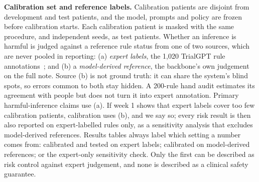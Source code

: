 \documentclass[10pt,a4paper]{article}
\begin{document}
\textbf{Calibration set and reference labels.} Calibration patients are disjoint from development and test patients, and the model, prompts and policy are frozen before calibration starts. Each calibration patient is masked with the same procedure, and independent seeds, as test patients. Whether an inference is harmful is judged against a reference rule status from one of two sources, which are never pooled in reporting: (a) \emph{expert labels}, the 1{,}020 TrialGPT rule annotations~\cite{trialgptann}; and (b) a \emph{model-derived reference}, the backbone's own judgement on the full note. Source (b) is not ground truth: it can share the system's blind spots, so errors common to both stay hidden. A 200-rule hand audit estimates its agreement with people but does not turn it into expert annotation. Primary harmful-inference claims use (a). If week 1 shows that expert labels cover too few calibration patients, calibration uses (b), and we say so; every risk result is then also reported on expert-labelled rules only, as a sensitivity analysis that excludes model-derived references. Results tables always label which setting a number comes from: calibrated and tested on expert labels; calibrated on model-derived references; or the expert-only sensitivity check. Only the first can be described as risk control against expert judgement, and none is described as a clinical safety guarantee.
\end{document}
